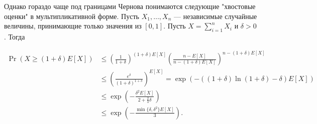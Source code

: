 \documentclass[12pt]{article}
\newcommand\eps{\varepsilon}
\begin{document}



Однако гораздо чаще под границами Чернова понимаются следующие "хвостовые оценки" в мультипликативной форме. Пусть $X_1, \dots, X_n$ --- независимые случайные величины, принимающие только значения из $[0, 1]$. Пусть $X = \sum_{i = 1}^n X_i$ и $\delta > 0$. Тогда

\begin{align*}
  \Pr(X \ge (1 + \delta)E[X]) &\le \left(\frac{1}{1 + \delta}\right)^{(1 + \delta)E[X]} \left(\frac{n - E[X]}{n - (1 + \delta)E[X]}\right)^{n - (1 + \delta)E[X]} \\
  &\le \left(\frac{e^\delta}{(1 + \delta)^{1 +\delta}}\right)^{E[X]} = \exp\left(-((1 + \delta)\ln(1 + \delta) - \delta)E[X]\right)\\
  &\le \exp\left(-\frac{\delta^2 E[X]}{2 + \frac{2}{3}\delta}\right)\\
  &\le \exp\left(-\frac{\min\{\delta, \delta^2\}E[X]}{3}\right).
\end{align*}
\end{document}
